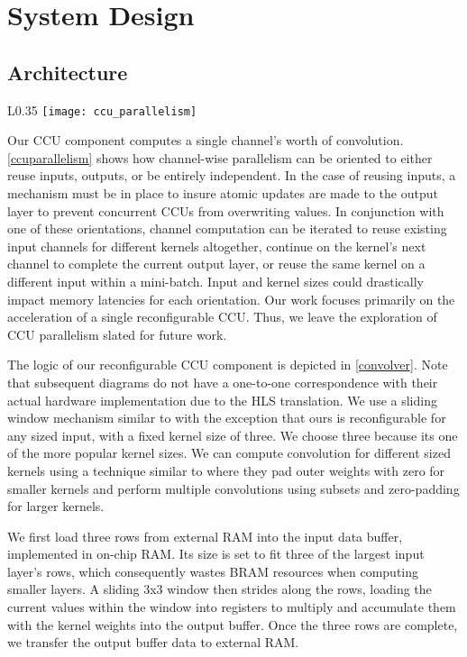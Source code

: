 \chapter{System Design}
\section{Architecture}

\begin{wrapfigure}{L}{0.35\textwidth}
	\texttt{[image: ccu\_parallelism]}
	\caption[CCU Channel-Wise Parallelism]%
	{\narrower Channel-wise convolution oriented to either reuse inputs, outputs, or stay independent.}
	\label{ccuparallelism}
\end{wrapfigure}

Our CCU component computes a single channel's worth of convolution. \ref{ccuparallelism} shows how channel-wise parallelism can be oriented to either reuse inputs, outputs, or be entirely independent. In the case of reusing inputs, a mechanism must be in place to insure atomic updates are made to the output layer to prevent concurrent CCUs from overwriting values. In conjunction with one of these orientations, channel computation can be iterated to reuse existing input channels for different kernels altogether, continue on the kernel's next channel to complete the current output layer, or reuse the same kernel on a different input within a mini-batch. Input and kernel sizes could drastically impact memory latencies for each orientation. Our work focuses primarily on the acceleration of a single reconfigurable CCU. Thus, we leave the exploration of CCU parallelism slated for future work.

The logic of our reconfigurable CCU component is depicted in \ref{convolver}. Note that subsequent diagrams do not have a one-to-one correspondence with their actual hardware implementation due to the HLS translation. We use a sliding window mechanism similar to \cite{liu2016automatic} with the exception that ours is reconfigurable for any sized input, with a fixed kernel size of three. We choose three because its one of the more popular kernel sizes. We can compute convolution for different sized kernels using a technique similar to \cite{guo2018angel} where they pad outer weights with zero for smaller kernels and perform multiple convolutions using subsets and zero-padding for larger kernels.

We first load three rows from external RAM into the input data buffer, implemented in on-chip RAM. Its size is set to fit three of the largest input layer's rows, which consequently wastes BRAM resources when computing smaller layers. A sliding 3x3 window then strides along the rows, loading the current values within the window into registers to multiply and accumulate them with the kernel weights into the output buffer. Once the three rows are complete, we transfer the output buffer data to external RAM.


